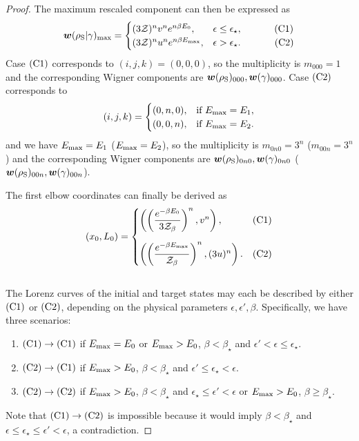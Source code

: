 \documentclass[pra,
aps,
twocolumn,
superscriptaddress,
groupedaddress,
nofootinbib,
reprint
]{revtex4-1}
\begin{document}
\begin{proof}
The maximum rescaled component can then be expressed as
\begin{equation*}
\bm{w}(\rho_{\rm{S}} | \gamma)_{\rm{max}} =
	\begin{cases}
		(3\mathcal{Z})^{n} v^n e^{n\beta E_0}, &\epsilon \leq \epsilon_{\star},\ \hspace{30pt}\rm{(C1)}	\\
		(3\mathcal{Z})^{n} u^n e^{n\beta E_{\rm{max}}}, &\epsilon > \epsilon_{\star}.\ \hspace{32pt}\rm{(C2)} 
	\end{cases}
\end{equation*}
Case $\rm{(C1)}$ corresponds to $(i,j,k) = (0,0,0)$, so the multiplicity is $m_{000} = 1$ and the corresponding Wigner components are $\bm{w}(\rho_{\rm{S}})_{000}, \bm{w}(\gamma)_{000}$. 
Case $\rm{(C2)}$ corresponds to
\begin{equation}
	(i,j,k) = 
	\begin{cases}
	(0,n,0), &\text{if } E_{\rm{max}} = E_1, \\
	(0,0,n), &\text{if } E_{\rm{max}} = E_2.
	\end{cases}
\end{equation}
and we have $E_{\rm{max}} = E_1$ ($E_{\rm{max}} = E_2$), so the multiplicity is $m_{0n0} = 3^n$ ($m_{00n} = 3^n$) and the corresponding Wigner components are $\bm{w}(\rho_{\rm{S}})_{0n0}, \bm{w}(\gamma)_{0n0}$ ($\bm{w}(\rho_{\rm{S}})_{00n}, \bm{w}(\gamma)_{00n}$).

The first elbow coordinates can finally be derived as
\begin{equation}\label{eq:first_elb_coords}
	(x_0, L_0) =
	\begin{cases}
		\left( \left(\dfrac{e^{-\beta E_0}}{3\Z_\beta}\right)^n, v^n \right), &\rm{(C1)}	\vspace{10pt}\\
		\left( \left(\dfrac{e^{-\beta E_{\rm{max}}}}{\Z_\beta}\right)^n, (3u)^n \right). &\rm{(C2)} 
	\end{cases}
\end{equation}
\null\\

The Lorenz curves of the initial and target states may each be described by either $\rm{(C1)}$ or $\rm{(C2)}$, depending on the physical parameters $\epsilon, \epsilon', \beta$.
Specifically, we have three scenarios:
\begin{enumerate}
	\item $\rm{(C1)} \rightarrow \rm{(C1)}$ if $E_{\rm{max}} = E_0$ or $E_{\rm{max}} > E_0$, $\beta < \beta_{\star}$ and $\epsilon' < \epsilon  \leq \epsilon_{\star}$.
	\item $\rm{(C2)} \rightarrow \rm{(C1)}$ if $E_{\rm{max}} > E_0$, $\beta < \beta_{\star}$ and $\epsilon' \leq \epsilon_{\star} < \epsilon$.
	\item $\rm{(C2)} \rightarrow \rm{(C2)}$ if $E_{\rm{max}} > E_0$, $\beta < \beta_{\star}$ and $\epsilon_{\star} \leq \epsilon' < \epsilon$ or $E_{\rm{max}} > E_0$, $\beta \geq \beta_{\star}$.
\end{enumerate}
Note that $\rm{(C1)} \rightarrow \rm{(C2)}$ is impossible because it would imply $\beta < \beta_{\star}$ and $\epsilon \leq \epsilon_{\star} \leq \epsilon' < \epsilon$, a contradiction.


\end{proof}
\end{document}
